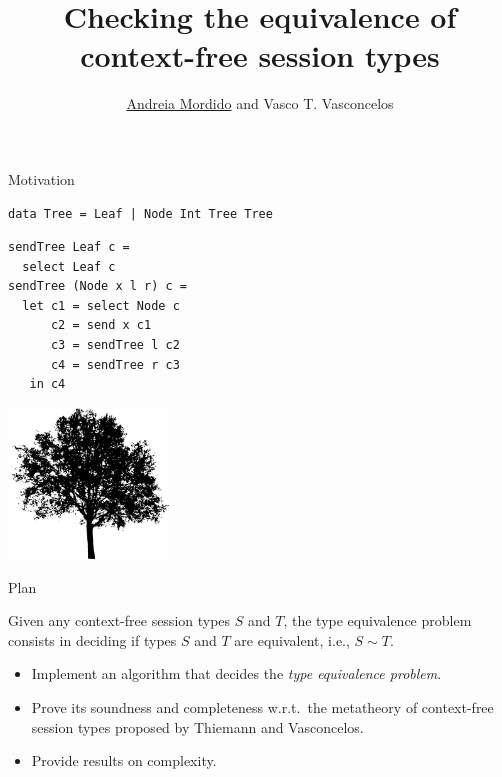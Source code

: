 \documentclass[10pt]{beamer}
\title[Checking the equivalence of context-free session types]{Checking the equivalence of context-free session types}
\date{
\vspace*{1cm}
\begin{center}
	January 2019
\end{center}}
\author[A.Mordido, V.Vasconcelos]{\underline{Andreia Mordido} and Vasco T. Vasconcelos}
\institute[LASIGE, Faculdade de Ci\^encias, ULisboa]{LASIGE, Faculdade de Ci\^encias, Universidade de Lisboa \\\\
}
\begin{document}
\lstset{language=Haskell}

\maketitle

\begin{frame}[fragile]{Motivation}
\vspace*{5mm}

\begin{lstlisting}[language=CFST]
data Tree = Leaf | Node Int Tree Tree
\end{lstlisting}

\begin{lstlisting}[language=CFST]
sendTree Leaf c =
  select Leaf c
sendTree (Node x l r) c =
  let c1 = select Node c
      c2 = send x c1
      c3 = sendTree l c2
      c4 = sendTree r c3
   in c4
\end{lstlisting}
  
\vspace*{-1.8cm}
\hfill \includegraphics[height=4cm]{img/tree}
\end{frame}


\begin{frame}{Plan}

  	\begin{definition} 
    	\smallskip 
    	Given any context-free session types $S$ and $T$, the type equivalence problem consists in deciding if types $S$ and $T$ are equivalent, i.e., $S\sim T$.
  	\end{definition}

  	\begin{itemize}
    	\item Implement an algorithm that decides the \emph{type equivalence problem}.
    	\item Prove its soundness and completeness w.r.t.\ the metatheory of context-free session types proposed by Thiemann and Vasconcelos.
    	\item Provide results on complexity.
  	\end{itemize}
\end{frame}
\end{document}
